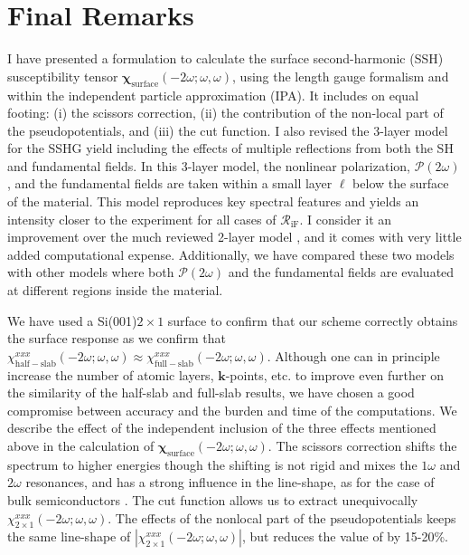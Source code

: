 \chapter{Final Remarks}\label{chap:conclusions}

I have presented a formulation to calculate the surface second-harmonic (SSH)
susceptibility tensor
$\boldsymbol{\chi}_{\mathrm{surface}}(-2\omega;\omega,\omega)$, using the length
gauge formalism and within the independent particle approximation (IPA). It
includes on equal footing: (i) the scissors correction, (ii) the contribution of
the non-local part of the pseudopotentials, and (iii) the cut function. I also
revised the 3-layer model for the SSHG yield including the effects of multiple
reflections from both the SH and fundamental fields. In this 3-layer model,  the
nonlinear polarization, $\boldsymbol{\mathcal{P}}(2\omega)$, and the fundamental
fields are taken within a small layer $\ell$ below the surface of the material.
This model reproduces key spectral features and yields an intensity closer to
the experiment for all cases of $\mathcal{R}_{\mathrm{iF}}$. I consider it an
improvement over the much reviewed 2-layer model \cite{mizrahiJOSA88}, and it
comes with very little added computational expense. Additionally, we have
compared these two models with other models where both
$\boldsymbol{\mathcal{P}}(2\omega)$ and the fundamental fields are evaluated at
different regions inside the material.

We have used a Si(001)$2\times 1$ surface to confirm that our scheme correctly
obtains the surface response as we confirm that
$\chi_{\mathrm{half-slab}}^{xxx}(-2\omega;\omega,\omega) \approx
\chi_{\mathrm{full-slab}}^{xxx}(-2\omega;\omega,\omega)$. Although one can in
principle increase the number of atomic layers, $\mathbf{k}$-points, etc. to
improve even further on the similarity of the half-slab and full-slab results,
we have chosen a good compromise between accuracy and the burden and time of the
computations. We describe the effect of the independent inclusion of the three
effects mentioned above in the calculation of
$\boldsymbol{\chi}_{\mathrm{surface}}(-2\omega;\omega,\omega)$. The scissors
correction shifts the spectrum to higher energies though the shifting is not
rigid and mixes the $1\omega$ and $2\omega$ resonances, and has a strong
influence in the line-shape, as for the case of bulk semiconductors
\cite{luppiJCP10, luppiPRB10, leitsmannPRB05}. The cut function allows us to
extract unequivocally $\chi^{xxx}_{2\times 1}(-2\omega;\omega,\omega)$. The
effects of the nonlocal part of the pseudopotentials keeps the same line-shape
of $|\chi^{xxx}_{2\times 1}(-2\omega;\omega,\omega)|$, but reduces the value of
by 15-20\%.

